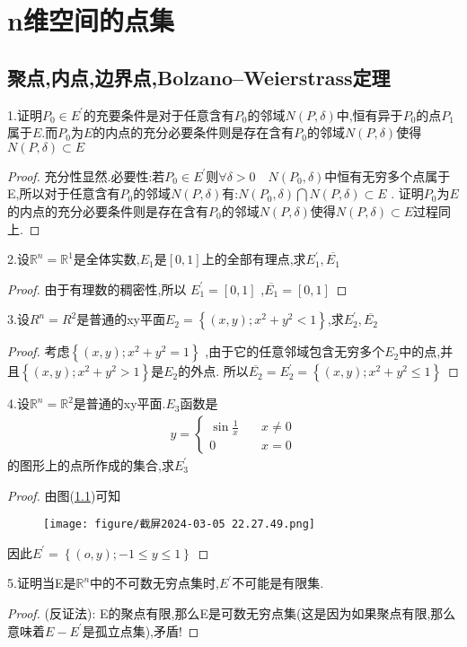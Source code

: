 \chapter{n维空间的点集}
\section{聚点,内点,边界点,Bolzano–Weierstrass定理}
1.证明\(P_0 \in E^{'}\)的充要条件是对于任意含有\(P_0\)的邻域\(N(P,\delta)\)中,恒有异于\(P_0\)的点\(P_1\)属于\(E\).而\(P_0\)为\(E\)的内点的充分必要条件则是存在含有\(P_0\)的邻域\(N(P,\delta)\)使得\(N(P,\delta) \subset E\)
\begin{proof}
    充分性显然.必要性:若\(P_0 \in E^{'}\)则\(\forall \delta > 0 \quad N(P_0 , \delta)\)中恒有无穷多个点属于E,所以对于任意含有\(P_0\)的邻域\(N(P,\delta)\)有:\(N(P_0 , \delta) \bigcap N(P, \delta) \subset E \) .
    证明\(P_0\)为\(E\)的内点的充分必要条件则是存在含有\(P_0\)的邻域\(N(P,\delta)\)使得\(N(P,\delta) \subset E\)过程同上.
\end{proof}
2.设\(\mathbb{R}^n = \mathbb{R}^1\)是全体实数,\(E_1\)是\([0,1]\)上的全部有理点,求\(E^{'}_1 , \overline{E_1}\)
\begin{proof}
    由于有理数的稠密性,所以 \(E^{'}_1 = [0,1]\) ,\(\overline{E_1}=[0,1]\)
\end{proof}
3.设\(R^n =R^2\)是普通的xy平面\(E_2 = \left\{(x,y) ; x^2 +y^2 <1 \right\}\),求\(E^{'}_2 , \overline{E_2}\)
\begin{proof}
    考虑\(\left\{(x,y) ; x^2 +y^2 =1\right\}\) ,由于它的任意邻域包含无穷多个\(E_2\)中的点,并且\(\left\{(x,y); x^2+y^2 > 1\right\}\)是\(E_2\)的外点.
    所以\(\overline{E_2}=E^{'}_2 =\left\{(x,y); x^2 + y^2 \leq 1\right\}\)
\end{proof}
4.设\(\mathbb{R}^n = \mathbb{R}^2\)是普通的xy平面.\(E_3\)函数是
\begin{align*}
    y=\begin{cases}
        \sin \frac{1}{x} \quad & x\neq 0 \\ 
         0 \quad &x=0
    \end{cases}
\end{align*}
的图形上的点所作成的集合,求\(E^{'}_3\)
\begin{proof}
    由图(\ref{fig:enter-label_298})可知
    \begin{figure}[h]
        \centering
        \texttt{[image: figure/截屏2024-03-05 22.27.49.png]}
        \caption{}
        \label{fig:enter-label_298}
    \end{figure}
    因此\(E^{'} = \left\{(o,y) ; -1\leq y\leq1\right\}\)
\end{proof}
5.证明当E是\(\mathbb{R}^n\)中的不可数无穷点集时,\(E^{'}\)不可能是有限集.
\begin{proof}
    (反证法): E的聚点有限,那么E是可数无穷点集(这是因为如果聚点有限,那么意味着\(E - E^{'}\)是孤立点集),矛盾!
\end{proof}
